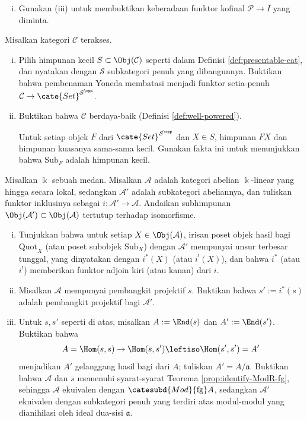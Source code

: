 \begin{Exercises}
\begin{enumerate}[(i)]
		\item Gunakan (iii) untuk membuktikan keberadaan funktor kofinal $\mathcal{P} \to I$ yang diminta.
	\end{enumerate}
	
	\item Misalkan kategori $\mathcal{C}$ terakses.
	\begin{enumerate}[(i)]
		\item Pilih himpunan kecil $S \subset \Obj(\mathcal{C})$ seperti dalam Definisi \ref{def:presentable-cat}, dan nyatakan dengan $\mathcal{S}$ subkategori penuh yang dibangunnya. Buktikan bahwa pembenaman Yoneda membatasi menjadi funktor setia-penuh $\mathcal{C} \to \cate{Set}^{\mathcal{S}^{\opp}}$.
		\item Buktikan bahwa $\mathcal{C}$ berdaya-baik (Definisi \ref{def:well-powered}).
		\begin{hint}
			Untuk setiap objek $F$ dari $\cate{Set}^{\mathcal{S}^{\opp}}$ dan $X \in S$, himpunan $FX$ dan himpunan kuasanya sama-sama kecil. Gunakan fakta ini untuk menunjukkan bahwa $\mathrm{Sub}_F$ adalah himpunan kecil.
		\end{hint}
	\end{enumerate}

	\item Misalkan $\Bbbk$ sebuah medan. Misalkan $\mathcal{A}$ adalah kategori abelian $\Bbbk$-linear yang hingga secara lokal, sedangkan $\mathcal{A}'$ adalah subkategori abeliannya, dan tuliskan funktor inklusinya sebagai $i: \mathcal{A}' \to \mathcal{A}$. Andaikan subhimpunan $\Obj(\mathcal{A}') \subset \Obj(\mathcal{A})$ tertutup terhadap isomorfisme.
	\begin{enumerate}[(i)]
		\item Tunjukkan bahwa untuk setiap $X \in \Obj(\mathcal{A})$, irisan poset objek hasil bagi $\mathrm{Quot}_X$ (atau poset subobjek $\mathrm{Sub}_X$) dengan $\mathcal{A}'$ mempunyai unsur terbesar tunggal, yang dinyatakan dengan $i^*(X)$ (atau $i^!(X)$), dan bahwa $i^*$ (atau $i^!$) memberikan funktor adjoin kiri (atau kanan) dari $i$.
		\item Misalkan $\mathcal{A}$ mempunyai pembangkit projektif $s$. Buktikan bahwa $s' := i^*(s)$ adalah pembangkit projektif bagi $\mathcal{A}'$.
		\item Untuk $s,s'$ seperti di atas, misalkan $A := \End(s)$ dan $A' := \End(s')$. Buktikan bahwa
		\[ A = \Hom(s, s) \to \Hom(s, s') \leftiso \Hom(s', s') = A' \]
		menjadikan $A'$ gelanggang hasil bagi dari $A$; tuliskan $A' = A/\mathfrak{a}$. Buktikan bahwa $\mathcal{A}$ dan $s$ memenuhi syarat-syarat Teorema \ref{prop:identify-ModR-fg}, sehingga $\mathcal{A}$ ekuivalen dengan $\catesubd{Mod}{\mathrm{fg}}A$, sedangkan $\mathcal{A}'$ ekuivalen dengan subkategori penuh yang terdiri atas modul-modul yang dianihilasi oleh ideal dua-sisi $\mathfrak{a}$.
	\end{enumerate}
\end{Exercises}
